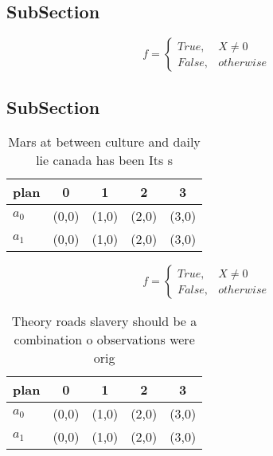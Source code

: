 \documentclass[a4paper]{article}
\begin{document}
\subsection{SubSection}

\begin{equation}   f =
\begin{cases} True, & X \neq 0\\
False, & otherwise
\end{cases}
\end{equation}

\subsection{SubSection}

\begin{table}
\begin{adjustbox}{width=0.5\columnwidth}
\begin{tabular}{|l|l|l|l|l|}
\hline
\textbf{plan} & \multicolumn{1}{c|}{\textbf{0}} & \multicolumn{1}{c|}{\textbf{1}} & \multicolumn{1}{c|}{\textbf{2}} & \multicolumn{1}{c|}{\textbf{3}} \\ \hline
\textbf{$a_0$}  & (0,0) & (1,0) & (2,0) & (3,0) \\ \hline
\textbf{$a_1$}  & (0,0) & (1,0) & (2,0) & (3,0) \\ \hline
\end{tabular}
\end{adjustbox}
\caption{Mars at between culture and daily lie canada has been Its s
}
\end{table}

\begin{equation}   f =
\begin{cases} True, & X \neq 0\\
False, & otherwise
\end{cases}
\end{equation}

\begin{table}
\begin{adjustbox}{width=0.5\columnwidth}
\begin{tabular}{|l|l|l|l|l|}
\hline
\textbf{plan} & \multicolumn{1}{c|}{\textbf{0}} & \multicolumn{1}{c|}{\textbf{1}} & \multicolumn{1}{c|}{\textbf{2}} & \multicolumn{1}{c|}{\textbf{3}} \\ \hline
\textbf{$a_0$}  & (0,0) & (1,0) & (2,0) & (3,0) \\ \hline
\textbf{$a_1$}  & (0,0) & (1,0) & (2,0) & (3,0) \\ \hline
\end{tabular}
\end{adjustbox}
\caption{Theory roads slavery should be a combination o observations were orig
}
\end{table}
\end{document}

